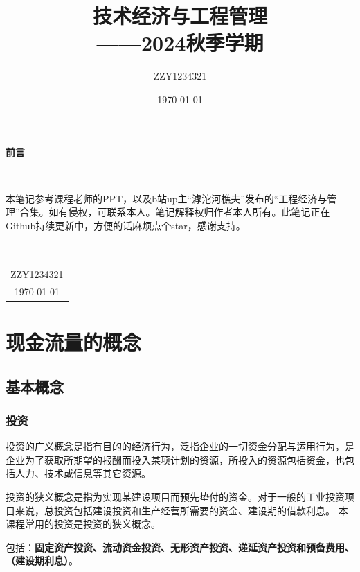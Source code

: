 \documentclass[12pt, a4paper, oneside]{ctexbook}
\title{{\Huge{\textbf{技术经济与工程管理}}}\\——2024秋季学期}
\author{ZZY1234321}
\date{\today}
\begin{document}
\pagestyle{fancy}
\fancyhf{}
\fancyhead[L]{\leftmark}
\fancyhead[R]{\thepage}
\renewcommand{\headheight}{15pt} %
\setlength{\headsep}{20pt} %

\maketitle

\setcounter{page}{1}

\begin{center}
    \Huge\textbf{前言}
\end{center}~\

本笔记参考课程老师的PPT，以及b站up主“滹沱河樵夫”发布的“工程经济与管理”合集。如有侵权，可联系本人。笔记解释权归作者本人所有。此笔记正在Github持续更新中，方便的话麻烦点个star，感谢支持。

~\\
\begin{flushright}
    \begin{tabular}{c}
        ZZY1234321\\
        \today
    \end{tabular}
\end{flushright}

\newpage
{}
\setcounter{page}{1}
\tableofcontents
\newpage
\setcounter{page}{1}

\chapter{现金流量的概念}

\section{基本概念}

\subsection{投资}
投资的广义概念是指有目的的经济行为，泛指企业的一切资金分配与运用行为，是企业为了获取所期望的报酬而投入某项计划的资源，所投入的资源包括资金，也包括人力、技术或信息等其它资源。

投资的狭义概念是指为实现某建设项目而预先垫付的资金。对于一般的工业投资项目来说，总投资包括建设投资和生产经营所需要的资金、建设期的借款利息。
本课程常用的投资是投资的狭义概念。

包括：\textbf{固定资产投资、流动资金投资、无形资产投资、递延资产投资和预备费用、（建设期利息）}。
\end{document}
